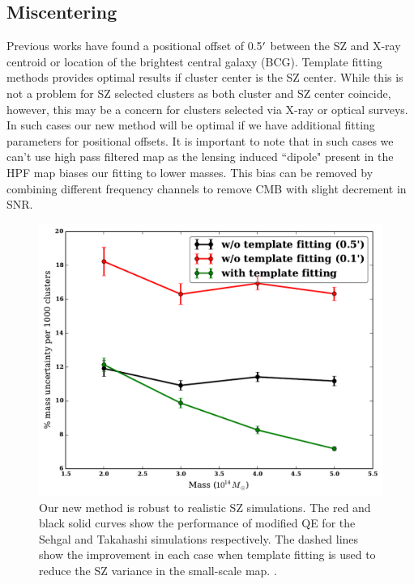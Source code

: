 \subsection{Miscentering}
Previous works have found a positional offset of 0.5$^{\prime}$ between the SZ and X-ray centroid \citep{linden14} or location of the brightest central galaxy (BCG)\citep{song12b}.
Template fitting methods provides optimal results if cluster center is the SZ center.
While this is not a problem for SZ selected clusters as both cluster and SZ center coincide, however, this may be a concern for clusters selected via X-ray or optical surveys.
In such cases our new method will be optimal if we have additional fitting parameters for positional offsets.
It is important to note that in such cases we can't use high pass filtered map as the lensing induced ``dipole" present in the HPF map biases our fitting to lower masses. %
This bias can be removed by combining different frequency channels to remove CMB with slight decrement in SNR.
\begin{figure}[htb]
\includegraphics[width=\linewidth]{figs/miscentering_results.pdf}
 \caption{
Our new method is robust to realistic SZ simulations. 
The red and black solid curves show the performance of modified QE for the Sehgal and Takahashi simulations respectively. 
The dashed lines show the improvement in each case when template fitting is used to reduce the SZ variance in the small-scale map. 
 .
 }
\label{fig:realistic_sims}
\end{figure}

